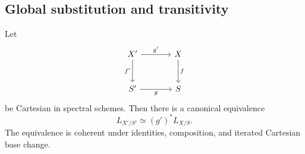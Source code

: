 \subsection{Global substitution and transitivity}

\begin{theorem}
\label{thm:global-cotangent-base-change}
Let
\[
\begin{tikzcd}[column sep=large, row sep=large]
    X' \arrow[r,"g'"] \arrow[d,"f'"']
        & X \arrow[d,"f"]
    \\
    S' \arrow[r,"g"']
        & S
\end{tikzcd}
\]
be Cartesian in spectral schemes. Then there is a canonical equivalence
\[
    L_{X'/S'}
    \simeq
    (g')^*L_{X/S}.
\]
The equivalence is coherent under identities, composition, and iterated
Cartesian base change.
\end{theorem}

